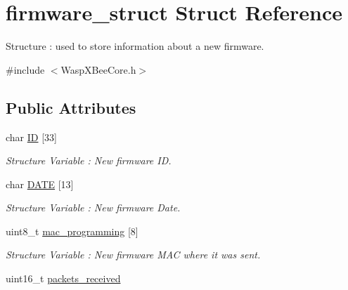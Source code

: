 \hypertarget{structfirmware__struct}{}\section{firmware\+\_\+struct Struct Reference}
\label{structfirmware__struct}


Structure \+: used to store information about a new firmware.  




{\ttfamily \#include $<$Wasp\+X\+Bee\+Core.\+h$>$}

\subsection*{Public Attributes}
\begin{DoxyCompactItemize}
\item 
char \hyperlink{structfirmware__struct_adff29b379009043a922cba09bfe97a5b}{ID} \mbox{[}33\mbox{]}\hypertarget{structfirmware__struct_adff29b379009043a922cba09bfe97a5b}{}\label{structfirmware__struct_adff29b379009043a922cba09bfe97a5b}

\begin{DoxyCompactList}\small\item\em Structure Variable \+: New firmware ID. \end{DoxyCompactList}\item 
char \hyperlink{structfirmware__struct_a8ee4feedbcdadc42816f4744855cea06}{D\+A\+TE} \mbox{[}13\mbox{]}\hypertarget{structfirmware__struct_a8ee4feedbcdadc42816f4744855cea06}{}\label{structfirmware__struct_a8ee4feedbcdadc42816f4744855cea06}

\begin{DoxyCompactList}\small\item\em Structure Variable \+: New firmware Date. \end{DoxyCompactList}\item 
uint8\+\_\+t \hyperlink{structfirmware__struct_a6fea7b487fd9cf30a2876a19ed7b5f6d}{mac\+\_\+programming} \mbox{[}8\mbox{]}\hypertarget{structfirmware__struct_a6fea7b487fd9cf30a2876a19ed7b5f6d}{}\label{structfirmware__struct_a6fea7b487fd9cf30a2876a19ed7b5f6d}

\begin{DoxyCompactList}\small\item\em Structure Variable \+: New firmware M\+AC where it was sent. \end{DoxyCompactList}\item 
uint16\+\_\+t \hyperlink{structfirmware__struct_a00815afd7b79dc17a5a0a9df0d3b2b07}{packets\+\_\+received}\hypertarget{structfirmware__struct_a00815afd7b79dc17a5a0a9df0d3b2b07}{}\label{structfirmware__struct_a00815afd7b79dc17a5a0a9df0d3b2b07}


\end{DoxyCompactItemize}
